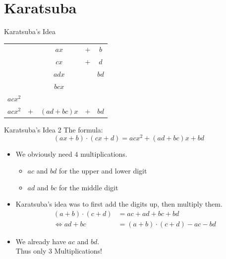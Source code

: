 \documentclass[12pt]{beamer}
\begin{document}
\section{Karatsuba}

\begin{frame}{Karatsuba's Idea}
\begin{center}
{\Huge
\begin{tabular}{ccccc}
        &   &      $ax$  & $+$ & $b$  \\
        &   &     $cx$   & $+$ & $d$  \\
\hline
        &   &    $adx$   &     & $bd$ \\
        &   &    $bcx$   &     &      \\
$acx^2$ &   &            &     &      \\
\hline
$acx^2$ &$+$& $(ad+bc)x$ & $+$ & $bd$
\end{tabular}
}
\end{center}
\end{frame}

\begin{frame}{Karatsuba's Idea 2}
The formula:
\[
(ax+b) \cdot (cx+d) = acx^2 + (ad+bc)x + bd
\]
\pause
\begin{itemize}
\item We obviously need $4$ multiplications.
\begin{itemize}
\item $ac$ and $bd$ for the upper and lower digit
\item $ad$ and $bc$ for the middle digit
\end{itemize}
\pause
\item Karatsuba's idea was to first add the digits up, then multiply them.
\begin{align*}
(a+b)\cdot(c+d) &= ac + ad + bc + bd\\
\Leftrightarrow  ad+bc &= (a+b)\cdot(c+d) - ac - bd
\end{align*}
\pause
\item We already have $ac$ and $bd$.\\
Thus only $3$ Multiplications!
\end{itemize}
\end{frame}
\end{document}
